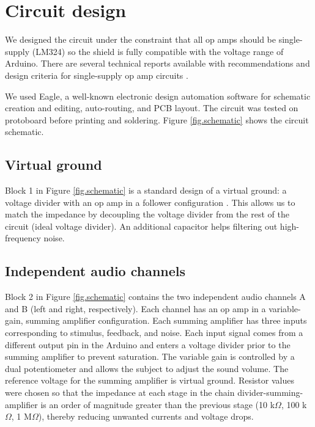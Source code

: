 \documentclass[twocolumn]{article}
\begin{document}
\section{Circuit design}

We designed the circuit under the constraint that all op amps should be single-supply (LM324) so the shield is fully compatible with the voltage range of Arduino. There are several technical reports available with recommendations and design criteria for single-supply op amp circuits \cite{singlesupply2000}.

We used Eagle, a well-known electronic design automation software for schematic creation and editing, auto-routing, and PCB layout. The circuit was tested on protoboard before printing and soldering. Figure \ref{fig.schematic} shows the circuit schematic.


\subsection{Virtual ground}

Block 1 in Figure \ref{fig.schematic} is a standard design of a virtual ground: a voltage divider with an op amp in a follower configuration \cite{singlesupply2000}. This allows us to match the impedance by decoupling the voltage divider from the rest of the circuit (ideal voltage divider). An additional capacitor helps filtering out high-frequency noise.


\subsection{Independent audio channels}

Block 2 in Figure \ref{fig.schematic} contains the two independent audio channels A and B (left and right, respectively). Each channel has an op amp in a variable-gain, summing amplifier configuration. Each summing amplifier has three inputs corresponding to stimulus, feedback, and noise. Each input signal comes from a different output pin in the Arduino and enters a voltage divider prior to the summing amplifier to prevent saturation. The variable gain is controlled by a dual potentiometer and allows the subject to adjust the sound volume. The reference voltage for the summing amplifier is virtual ground. Resistor values were chosen so that the impedance at each stage in the chain divider-summing-amplifier is an order of magnitude greater than the previous stage (10 k$\Omega$, 100 k$\Omega$, 1 M$\Omega$), thereby reducing unwanted currents and voltage drops.
\end{document}

